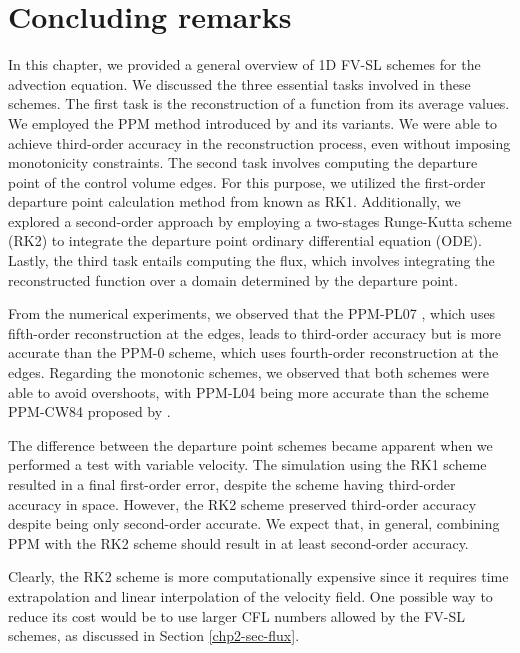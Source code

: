\section{Concluding remarks}
\label{chp2-sec-conclusion}
In this chapter, we provided a general overview of 1D FV-SL schemes for the advection equation.
We discussed the three essential tasks involved in these schemes.
The first task is the reconstruction of a function from its average values.
We employed the PPM method introduced by \citet{colella:1984} and its variants.
We were able to achieve third-order accuracy in the reconstruction process, even without imposing monotonicity constraints.
The second task involves computing the departure point of the control volume edges. For this purpose, 
we utilized the first-order departure point calculation method from \citet{colella:1984}  known as RK1.
Additionally, we explored a second-order approach by employing a two-stages Runge-Kutta scheme (RK2) 
to integrate the departure point ordinary differential equation (ODE).
Lastly, the third task entails computing the flux, which involves integrating the 
reconstructed function over a domain determined by the departure point.

From the numerical experiments, we observed that the PPM-PL07 \citep{putman:2007},
which uses fifth-order reconstruction at the edges, leads to third-order accuracy but is 
more accurate than the PPM-0 \citep{colella:1984} scheme, which uses fourth-order 
reconstruction at the edges.
Regarding the monotonic schemes, we observed that both schemes were able to avoid 
overshoots, with PPM-L04 \citep{lin:2004} being more accurate than the scheme
PPM-CW84 proposed by \citet{colella:1984}.

The difference between the departure point schemes became apparent when we performed a test 
with variable velocity. The simulation using the RK1 scheme resulted in a final first-order 
error, despite the scheme having third-order accuracy in space. However, the RK2 scheme 
preserved third-order accuracy despite being only second-order accurate. We expect that, in 
general, combining PPM with the RK2 scheme should result in at least second-order accuracy.

Clearly, the RK2 scheme is more computationally expensive since it requires time 
extrapolation and linear interpolation of the velocity field. One possible way to reduce 
its cost would be to use larger CFL numbers allowed by the FV-SL schemes, as discussed in 
Section \ref{chp2-sec-flux}.
